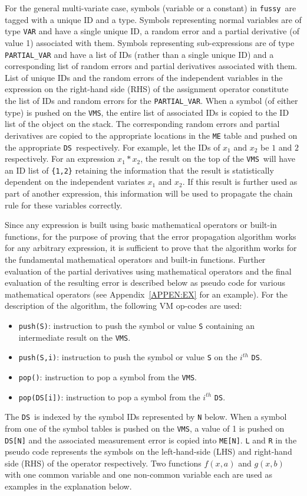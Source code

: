 \documentclass[acmtoms,acmnow]{acmtrans2m}
\newcommand{\Fussy}{{\tt fussy}}
\newcommand{\DS}{{\tt DS}}
\newcommand{\VMS}{{\tt VMS}}
\begin{document}
For the general multi-variate case, symbols (variable or a constant)
in \Fussy\ are tagged with a unique ID and a type.  Symbols
representing normal variables are of type {\tt VAR} and have a single
unique ID, a random error and a partial derivative (of value 1)
associated with them.  Symbols representing sub-expressions are of
type {\tt PARTIAL\_VAR} and have a list of IDs (rather than a single
unique ID) and a corresponding list of random errors and partial
derivatives associated with them.  List of unique IDs and the random
errors of the independent variables in the expression on the
right-hand side (RHS) of the assignment operator constitute the list
of IDs and random errors for the {\tt PARTIAL\_VAR}.  When a symbol
(of either type) is pushed on the \VMS, the entire list of associated
IDs is copied to the ID list of the object on the stack.  The
corresponding random errors and partial derivatives are copied to the
appropriate locations in the {\tt ME} table and pushed on the
appropriate \DS\ respectively.  For example, let the IDs of $x_1$ and
$x_2$ be $1$ and $2$ respectively.  For an expression $x_1 * x_2$, the
result on the top of the \VMS\ will have an ID list of {\tt \{1,2\}}
retaining the information that the result is statistically dependent
on the independent variates $x_1$ and $x_2$.  If this result is
further used as part of another expression, this information will be
used to propagate the chain rule for these variables correctly.

Since any expression is built using basic mathematical operators or
built-in functions, for the purpose of proving that the error
propagation algorithm works for any arbitrary expression, it is
sufficient to prove that the algorithm works for the fundamental
mathematical operators and built-in functions.  Further evaluation of
the partial derivatives using mathematical operators and the final
evaluation of the resulting error is described below as pseudo code
for various mathematical operators (see Appendix~\ref{APPEN:EX} for an
example).  For the description of the algorithm, the following VM
op-codes are used:
\begin{itemize}
\item {\tt push(S)}: instruction to push the symbol or value {\tt S}
containing an intermediate result on the \VMS.
\item {\tt push(S,i)}: instruction to push the symbol or value {\tt S}
on the $i^{th}$ \DS. 
\item {\tt pop()}: instruction to pop a symbol from the \VMS.
\item {\tt pop(DS[i])}: instruction to pop a symbol from the $i^{th}$ \DS.
\end{itemize}
The \DS\ is indexed by the symbol IDs represented by {\tt N} below.
When a symbol from one of the symbol tables is pushed on the \VMS, a
value of 1 is pushed on {\tt DS[N]} and the associated measurement
error is copied into {\tt ME[N]}.  {\tt L} and {\tt R} in the pseudo
code represents the symbols on the left-hand-side (LHS) and right-hand
side (RHS) of the operator respectively.  Two functions $f(x,a)$ and
$g(x,b)$ with one common variable and one non-common variable each are
used as examples in the explanation below.
\end{document}
